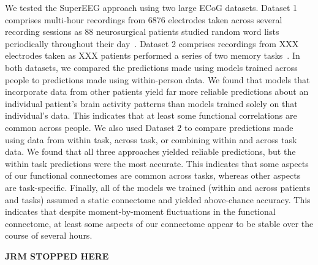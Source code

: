 \documentclass[12pt]{article}
\begin{document}
We tested the SuperEEG approach using two large ECoG datasets. Dataset 1 comprises multi-hour recordings from 6876 electrodes taken across several recording sessions as 88 neurosurgical patients studied random word lists periodically throughout their day~\cite{SedeEtal03, SedeEtal07a,
  SedeEtal07b, MannEtal11, MannEtal12}.  Dataset 2 comprises recordings from XXX electrodes taken as XXX patients performed a series of two memory tasks~\citep{EzzyEtal17, HoraEtal17, KragEtal17, KuceEtal17, LinEtal17, SoloEtal18, WeidEtal18, EzzyEtal18, KuceEtal18}.  In both datasets, 
  we compared the predictions made using models trained across people to predictions made using within-person data.  We found that models that incorporate data from other patients yield far more reliable predictions about an individual patient's brain activity patterns than models trained solely on that individual's data.  This indicates that at least some functional correlations are common across people.  We also used Dataset 2 to compare predictions made using data from within task, across task, or combining within and across task data.  We found that all three approaches yielded reliable predictions, but the within task predictions were the most accurate.  This indicates that some aspects of our functional connectomes are common across tasks, whereas other aspects are task-specific.  Finally, all of the models we trained (within and across patients and tasks) assumed a static connectome and yielded above-chance accuracy.  This indicates that despite moment-by-moment fluctuations in the functional connectome, at least some aspects of our connectome appear to be stable over the course of several hours.

\textbf{JRM STOPPED HERE}
\end{document}
